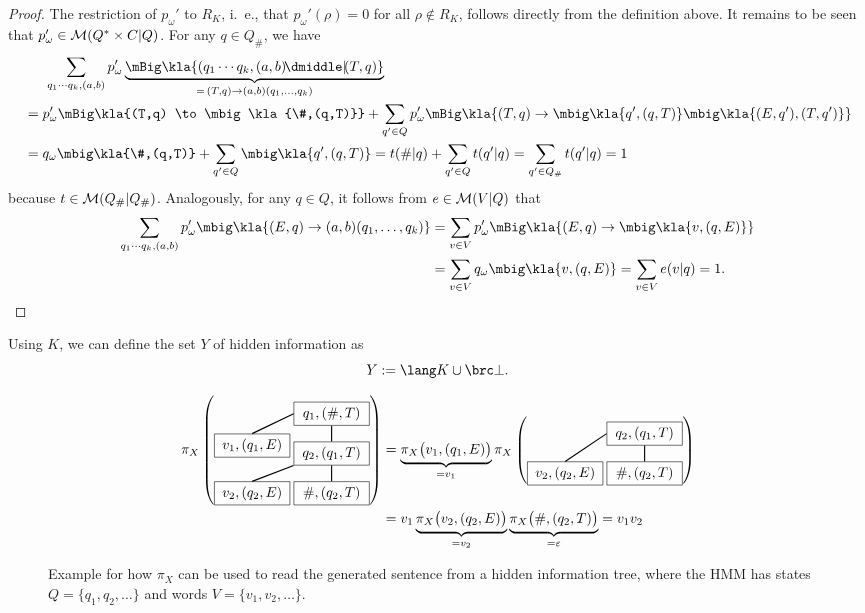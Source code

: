 \begin{proof}
 The restriction of $p_\omega'$ to $R_K$, i.~e., that $p_\omega'(\rho)=0$ for all
 $\rho\notin R_K$, follows directly from the definition above. It remains to be seen
 that $p_\omega'\in\mathcal M(Q^*\times C|Q)$. For any $q\in Q_\#$, we have
 \begin{align*}
  &\hspace{1.5em} \sum_{q_1\cdots q_k,(a,b)} p_\omega'\underbrace{\mBig\kla{(q_1\cdots q_k,(a,b)\npipe(T,q)}}_{=\,(T,q)\to(a,b)(q_1,\ldots,q_k)} \\
  &= p_\omega'\mBig\kla{(T,q) \to \mbig\kla{\#,(q,T)}} + \sum_{q'\in Q} p_\omega'\mBig\kla{(T,q) \to \mbig\kla{q',(q,T)}\mbig\kla{(E,q'),(T,q')}} \\
  &= q_\omega\mbig\kla{\#,(q,T)} + \sum_{q'\in Q} \mbig\kla{q',(q,T)} = t(\#|q) + \sum_{q'\in Q} t(q'|q) = \sum_{q'\in Q_\#} t(q'|q) = 1
 \end{align*}
 because $t\in\mathcal M(Q_\#|Q_\#)$. Analogously, for any $q\in Q$, it follows from $e\in\mathcal M(V|Q)$ that
 \begin{align*}
  \sum_{q_1\cdots q_k,(a,b)} p_\omega'\mbig\kla{(E,q)\to(a,b)(q_1,\ldots,q_k)}
  &= \sum_{v\in V} p_\omega'\mBig\kla{(E,q) \to \mbig\kla{v,(q,E)}} \\
  &= \sum_{v\in V} q_\omega\mbig\kla{v,(q,E)} = \sum_{v\in V} e(v|q) = 1.
  \qedhere
 \end{align*}
\end{proof}

Using $K$, we can define the set $Y$ of hidden information as
\[
 Y := \lang K \cup \brc\bot.
\]

\begin{figure}[t!]
 \begin{align*}
  \pi_X\left(\begin{tikzpicture}[every node/.style={rectangle,draw,minimum width=1.9cm},baseline=(current bounding box.center)]
   \node (t0) at (0,0) { $q_1,(\#,T)$ };
   \node (t1) at (0,-1) { $q_2,(q_1,T)$ } edge[thick] (t0);
   \node (t2) at (0,-2) { $\#,(q_2,T)$ } edge[thick] (t1);
   \node (e1) at (-2,-0.8) { $v_1,(q_1,E)$ }; \draw [thick] (t0.west) -- (e1.north);
   \node (e2) at (-2,-2) { $v_2,(q_2,E)$ }; \draw [thick] (t1.south west) -- (e2.north);
  \end{tikzpicture}\right)
  &=
   \underbrace{\pi_X\bigl(v_1,(q_1,E)\bigr)}_{=v_1}
   \pi_X\left(\begin{tikzpicture}[every node/.style={rectangle,draw,minimum width=1.9cm},baseline=(current bounding box.center)]
    \node (t1) at (0,0) { $q_2,(q_1,T)$ };
    \node (t2) at (0,-1) { $\#,(q_2,T)$ } edge[thick] (t1);
    \node (e2) at (-2,-1) { $v_2,(q_2,E)$ }; \draw [thick] (t1.west) -- (e2.north);
   \end{tikzpicture}\right)
  \\
  &= v_1
   \underbrace{\pi_X\bigl(v_2,(q_2,E)\bigr)}_{=v_2}
   \underbrace{\pi_X\bigl(\#,(q_2,T)\bigr)}_{=\eps}
   = v_1v_2
 \end{align*}
 \caption{\label{fig:03-readoff}%
  Example for how $\pi_X$ can be used to read the generated sentence from a hidden information tree, where the HMM has states $Q = \{q_1,q_2,\ldots\}$ and words $V = \{v_1,v_2,\ldots\}$.
 }
\end{figure}

